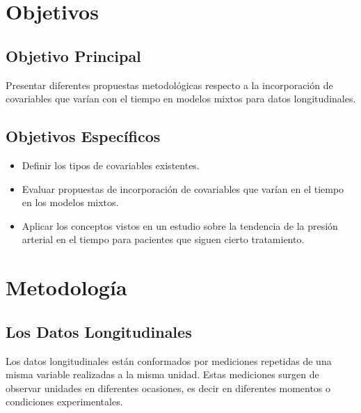 \documentclass[spanish]{article}
\numberwithin{figure}{subsection}
\numberwithin{equation}{subsection}
\numberwithin{table}{subsection}
\begin{document}

\newpage
\section{Objetivos}

\subsection{Objetivo Principal}

Presentar diferentes propuestas metodológicas respecto a la incorporación de
covariables que varían con el tiempo en modelos mixtos para datos
longitudinales.

\subsection{Objetivos Específicos}

\begin{itemize}
	\item Definir los tipos de covariables existentes.
	\item Evaluar propuestas de incorporación de covariables que varían en el
	tiempo en los modelos mixtos.
	\item Aplicar los conceptos vistos en un estudio sobre la tendencia de la
		  presión arterial en el tiempo para pacientes que siguen cierto
		  tratamiento.
\end{itemize}

\newpage
\section{Metodología}

\subsection{Los Datos Longitudinales}

Los datos longitudinales están conformados por mediciones repetidas de una
misma variable realizadas a la misma unidad. Estas mediciones surgen de
observar unidades en diferentes ocasiones, es decir en diferentes momentos o
condiciones experimentales.
\end{document}
